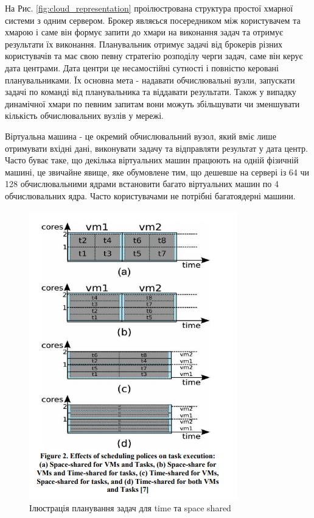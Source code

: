 На Рис. \ref{fig:cloud_representation} проілюстрована структура простої хмарної системи з одним сервером. Брокер являєься посередником між користувачем та хмарою і саме він формує запити до хмари на виконання задач та отримує результати їх виконання. Планувальник отримує задачі від брокерів різних користувачів та має свою певну стратегію розподілу черги задач, саме він керує дата центрами. Дата центри це несамостійні сутності і повністю керовані планувальниками. Їх основна мета - надавати обчислювальні вузли, запускати задачі по команді від планувальника та віддавати результати. Також у випадку динамічної хмари по певним запитам вони можуть збільшувати чи зменшувати кількість обчислювальних вузлів у мережі.

Віртуальна машина - це окремий обчислювальний вузол, який вміє лише отримувати вхідні дані, виконувати задачу та відправляти результат у дата центр. Часто буває таке, що декілька віртуальних машин працюють на одній фізичній машині, це звичайне явище, яке обумовлене тим, що дешевше на сервері із 64 чи 128 обчислювальними ядрами встановити багато віртуальних машин по 4 обчислювальних ядра. Часто користувачами не потрібні багатоядерні машини.

\begin{figure}[H]
	\centering
	\includegraphics[width=\textwidth]{task_analysis/img/time_space_shared}
	\caption{Ілюстрація планування задач для time та space shared }
	\label{fig:time_space_shared}
\end{figure}

